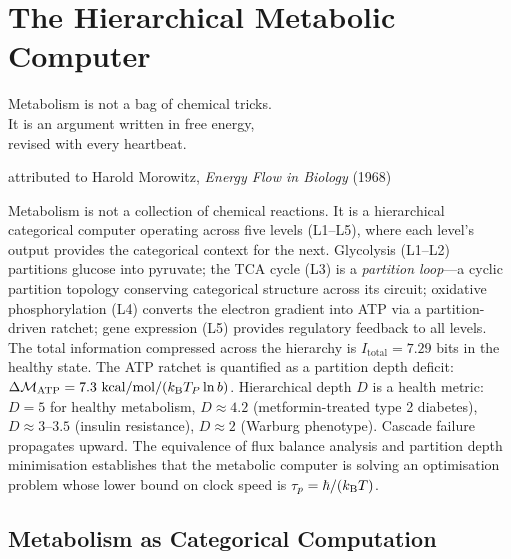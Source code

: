 
\chapter{The Hierarchical Metabolic Computer}
\label{chap:metabolic_computer}

\epigraph{%
  Metabolism is not a bag of chemical tricks.\\
  It is an argument written in free energy,\\
  revised with every heartbeat.%
}{attributed to Harold Morowitz, \textit{Energy Flow in Biology} (1968)}

\begin{chapterbox}
Metabolism is not a collection of chemical reactions. It is a hierarchical
categorical computer operating across five levels (L1--L5), where each
level's output provides the categorical context for the next. Glycolysis
(L1--L2) partitions glucose into pyruvate; the TCA cycle (L3) is a
\emph{partition loop}---a cyclic partition topology conserving categorical
structure across its circuit; oxidative phosphorylation (L4) converts the
electron gradient into ATP via a partition-driven ratchet; gene expression
(L5) provides regulatory feedback to all levels. The total information
compressed across the hierarchy is $I_{\mathrm{total}} = 7.29$ bits in the
healthy state. The ATP ratchet is quantified as a partition depth deficit:
$\Delta\mathcal{M}_{\mathrm{ATP}} = 7.3\ \mathrm{kcal/mol} / (k_{\mathrm{B}} T_P \ln b)$.
Hierarchical depth $D$ is a health metric: $D = 5$ for healthy metabolism,
$D \approx 4.2$ (metformin-treated type 2 diabetes), $D \approx 3$--$3.5$
(insulin resistance), $D \approx 2$ (Warburg phenotype). Cascade failure
propagates upward. The equivalence of flux balance analysis and partition
depth minimisation establishes that the metabolic computer is solving an
optimisation problem whose lower bound on clock speed is $\tau_p = \hbar/(k_{\mathrm{B}} T)$.
\end{chapterbox}

\section{Metabolism as Categorical Computation}
\label{sec:metabolism_computation}

